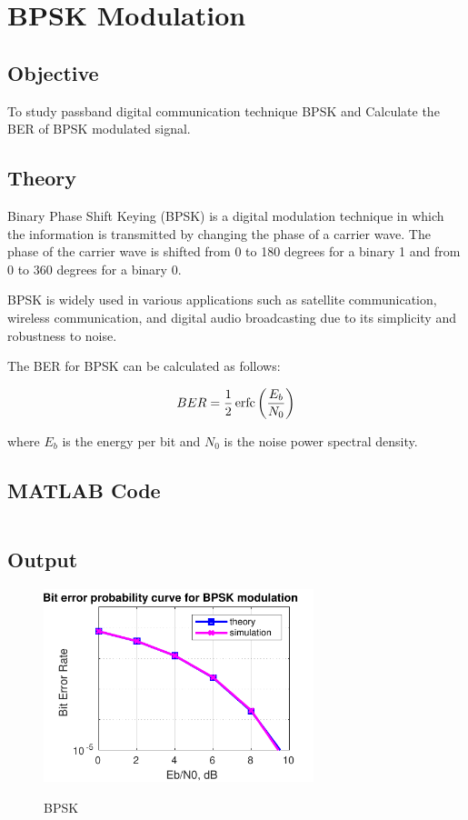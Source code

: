 \section{BPSK Modulation}
\label{sec:bpsk}

\subsection{Objective}
To study passband digital communication technique BPSK and
Calculate the BER of BPSK modulated signal.

\subsection{Theory}
Binary Phase Shift Keying (BPSK) is a digital modulation technique
in which the information is transmitted by changing the phase of a
carrier wave. The phase of the carrier wave is shifted
from 0 to 180 degrees for a binary 1 and from 0 to 360 degrees
for a binary 0.

BPSK is widely used in various applications such as satellite communication,
wireless communication, and digital audio broadcasting due
to its simplicity and robustness to noise.

The BER for BPSK can be calculated as follows:

\begin{equation}
    \label{eq:bpsk}
    BER = \frac{1}{2}\, \textnormal{erfc}\left( \frac{E_b}{N_0} \right)
\end{equation}

where $E_b$ is the energy per bit and $N_0$ is the noise power spectral density.

\subsection{MATLAB Code}

\inputminted[fontsize=\footnotesize,autogobble]{matlab}{code/bpsk.m}

\subsection{Output}

\begin{figure}[!htb]
    \centering
    \includegraphics[width=0.7\textwidth]{res/figures/BPSK.pdf}
    \label{output:bpsk}
    \caption{BPSK}
\end{figure}

